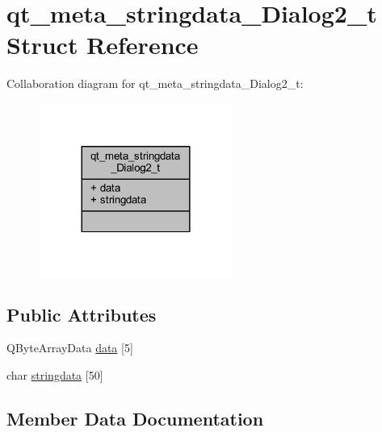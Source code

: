 \hypertarget{structqt__meta__stringdata___dialog2__t}{}\section{qt\+\_\+meta\+\_\+stringdata\+\_\+\+Dialog2\+\_\+t Struct Reference}
\label{structqt__meta__stringdata___dialog2__t}


Collaboration diagram for qt\+\_\+meta\+\_\+stringdata\+\_\+\+Dialog2\+\_\+t\+:
\nopagebreak
\begin{figure}[H]
\begin{center}
\leavevmode
\includegraphics[width=180pt]{dd/de1/structqt__meta__stringdata___dialog2__t__coll__graph}
\end{center}
\end{figure}
\subsection*{Public Attributes}
\begin{DoxyCompactItemize}
\item 
Q\+Byte\+Array\+Data \hyperlink{structqt__meta__stringdata___dialog2__t_a69b0d4bf9e36d06fbed3232e57c8aa23}{data} \mbox{[}5\mbox{]}
\item 
char \hyperlink{structqt__meta__stringdata___dialog2__t_a90ba8b45c1f6c6c582696e92e6f99a78}{stringdata} \mbox{[}50\mbox{]}
\end{DoxyCompactItemize}


\subsection{Member Data Documentation}
\hypertarget{structqt__meta__stringdata___dialog2__t_a69b0d4bf9e36d06fbed3232e57c8aa23}{}
